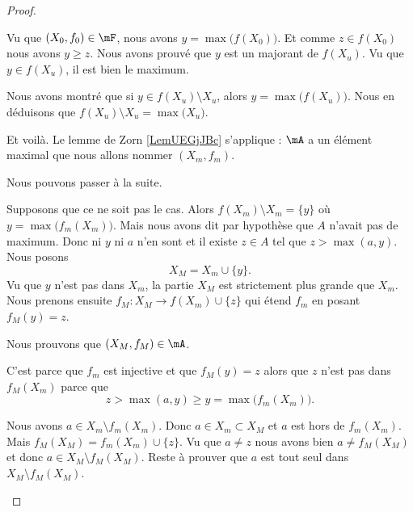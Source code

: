 \begin{proof}
\begin{subproof}
\begin{subproof}
			Vu que \( (X_0,f_0)\in \mF\), nous avons \( y=\max\big( f(X_0) \big)\). Et comme \( z\in f(X_0)\) nous avons \( y\geq z\). Nous avons prouvé que \( y\) est un majorant de \( f(X_u)\). Vu que \( y\in f(X_u)\), il est bien le maximum.

			Nous avons montré que si \( y\in f(X_u)\setminus X_u\), alors \( y=\max\big( f(X_u) \big)\). Nous en déduisons que \( f(X_u)\setminus X_u=\max\big( X_u \big)\).
		\end{subproof}
	\end{subproof}
	Et voilà. Le lemme de Zorn \ref{LemUEGjJBc} s'applique : \( \mA\) a un élément maximal que nous allons nommer \( (X_m,f_m)\).

	Nous pouvons passer à la suite.
	\begin{subproof}
		\spitem[	\( f(X_m)\setminus X_m=\emptyset\)]

		Supposons que ce ne soit pas le cas. Alors \( f(X_m)\setminus X_m=\{ y \}\) où \( y=\max\big( f_m(X_m) \big)\). Mais nous avons dit par hypothèse que \( A\) n'avait pas de maximum. Donc ni \( y\) ni \( a\) n'en sont et il existe \( z\in A\) tel que \( z>\max(a,y)\). Nous posons
		\begin{equation}
			X_M=X_m\cup\{ y \}.
		\end{equation}
		Vu que \( y\) n'est pas dans \( X_m\), la partie \( X_M\) est strictement plus grande que \( X_m\). Nous prenons ensuite \(f_M \colon X_M\to f(X_m)\cup \{ z \}  \) qui étend \( f_m\) en posant \( f_M(y)=z\).

		Nous prouvons que \( (X_M,f_M)\in\mA\).

		\begin{subproof}
			C'est parce que \( f_m\) est injective et que \( f_M(y)=z\) alors que \( z\) n'est pas dans \( f_M(X_m)\) parce que
			\begin{equation}
				z>\max(a,y)\geq y=\max\big( f_m(X_m) \big).
			\end{equation}

			\spitem[\( X_M\setminus f_M(X_M)=\lbrace a \rbrace\)]
			Nous avons \( a\in X_m\setminus f_m(X_m)\). Donc \( a\in X_m\subset X_M\) et \( a\) est hors de \( f_m(X_m)\). Mais \( f_M(X_M)=f_m(X_m)\cup\{ z \}\). Vu que \( a\neq z\) nous avons bien \( a\neq f_M(X_M)\) et donc \( a\in X_M\setminus f_M(X_M)\). Reste à prouver que \( a\) est tout seul dans \( X_M\setminus f_M(X_M)\).


\end{subproof}
\end{subproof}
\end{proof}

